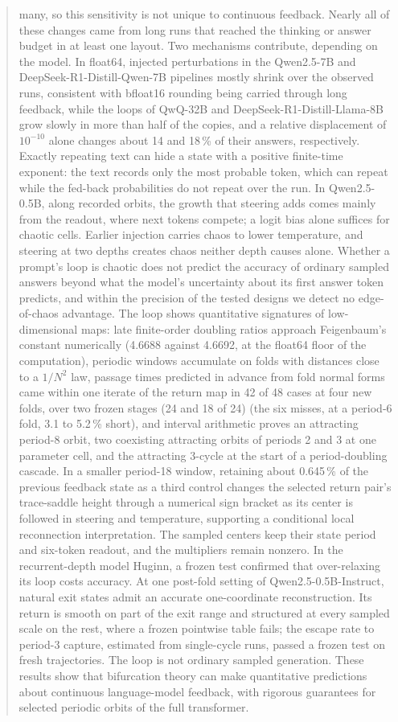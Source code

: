\documentclass[11pt,letterpaper]{article}
\begin{document}
\begin{abstract}
many, so this sensitivity is not unique to continuous feedback. Nearly all of these changes came from long runs that
reached the thinking or answer budget in at least one layout. Two mechanisms contribute, depending on the model. In
float64, injected perturbations in the Qwen2.5-7B and DeepSeek-R1-Distill-Qwen-7B pipelines mostly shrink over the observed runs,
consistent with bfloat16 rounding being carried through long feedback, while the loops of QwQ-32B and
DeepSeek-R1-Distill-Llama-8B grow slowly in more than half of the copies, and a relative displacement of $10^{-10}$
alone changes about 14 and 18\,\% of their answers, respectively. Exactly repeating text can hide a state with a
positive finite-time exponent: the text records only the most probable token, which can repeat while the fed-back
probabilities do not repeat over the run. In Qwen2.5-0.5B, along recorded orbits, the growth that steering adds comes mainly
from the readout, where next tokens compete; a logit bias alone suffices for chaotic cells. Earlier injection carries chaos to lower temperature, and steering at two depths creates
chaos neither depth causes alone. Whether a prompt's loop is chaotic does not predict the accuracy of ordinary sampled
answers beyond what the model's uncertainty about its first answer token predicts, and within the precision of the
tested designs we detect no edge-of-chaos advantage. The loop shows quantitative signatures of low-dimensional maps:
late finite-order doubling ratios approach Feigenbaum's constant numerically (4.6688 against 4.6692, at the float64
floor of the computation), periodic windows accumulate on folds with distances close to a $1/N^2$ law, passage times
predicted in advance from fold normal forms came within one iterate of the return map in 42 of 48 cases at four new folds, over two frozen stages (24 and 18 of
24) (the six
misses, at a period-6 fold, 3.1 to 5.2\,\% short), and interval arithmetic proves an attracting period-8 orbit, two coexisting
attracting orbits of periods 2 and 3 at one parameter cell, and the attracting 3-cycle at the start of a
period-doubling cascade. In a smaller period-18 window, retaining about 0.645\,\% of the previous feedback
state as a third control changes the selected return pair's trace-saddle height through a numerical sign bracket
as its center is followed in steering and temperature, supporting a conditional local reconnection interpretation. The sampled centers keep their state period and six-token readout, and the
multipliers remain nonzero. In the recurrent-depth model Huginn, a frozen test confirmed that over-relaxing its loop costs accuracy. At one post-fold setting of Qwen2.5-0.5B-Instruct, natural exit states admit an accurate one-coordinate reconstruction. Its return is smooth on part of the exit
range and structured at every sampled scale on the rest, where a frozen pointwise table fails; the escape rate to
period-3 capture, estimated from single-cycle runs, passed a frozen test on fresh trajectories. The loop is not
ordinary sampled generation. These results show that bifurcation theory can make quantitative predictions about continuous language-model
feedback, with rigorous guarantees for selected periodic orbits of the full transformer.
\end{abstract}
\end{document}
